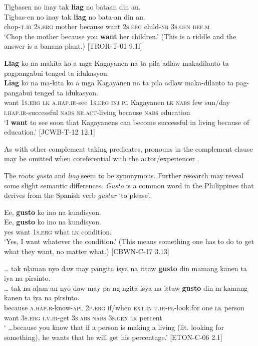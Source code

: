 \ea
Tigbasen  no  inay  tak  \textbf{liag}  no  bataan  din  an. \\\smallskip
\gll Tigbas-en  no  inay  tak  \textbf{liag}  no  bata-an  din  an. \\
chop-\textsc{t.ir}  2\textsc{s.erg}  mother  because  want  2\textsc{s.erg}  child-\textsc{nr}  3\textsc{s.gen}  \textsc{def.m} \\
\glt ‘Chop the mother because you \textbf{want} her children.’ (This is a riddle and the answer is a banana plant.) [TROR-T-01 9.1l]
\z

\ea
\textbf{Liag}  ko  na  makita  ko  a  mga  Kagayanen  na  ta  pila adlaw  makadilanto  ta  pagpangabui  tenged  ta  idukasyon. \\\smallskip
\gll \textbf{Liag}  ko  na  ma-kita  ko  a  mga  Kagayanen  na  ta  pila adlaw  maka-dilanto  ta  pag-pangabui  tenged  ta  idukasyon. \\
want  1\textsc{s.erg}  \textsc{lk}  \textsc{a.hap.ir}-see  1\textsc{s.erg}  \textsc{inj}  \textsc{pl}  Kagayanen  \textsc{lk}  \textsc{nabs}  few
sun/day  \textsc{i.hap.ir}-successful  \textsc{nabs}  \textsc{nr.act}-living  because  \textsc{nabs}  education \\
\glt `I \textbf{want} to see soon that Kagayanens can become successful in living because of education.’ [JCWB-T-12 12.1]
\z

As with other complement taking predicates, pronouns in the complement clause may be omitted when coreferential with the actor/experiencer .

The roots \textit{gusto} and \textit{liag} seem to be synonymous. Further research may reveal some slight semantic differences. \textit{Gusto} is a common word in the Philippines that derives from the Spanish verb \textit{gustar} `to please'. 

\ea
Ee,  \textbf{gusto}  ko  ino  na  kundisyon. \\\smallskip
\gll Ee,  \textbf{gusto}  ko  ino  na  kundisyon. \\
yes  want  1\textsc{s.erg}  what  \textsc{lk}  condition. \\
\glt ‘Yes, I want whatever the condition.’ (This means something one has to do to get what they want, no matter what.) [CBWN-C-17 3.13]
\z

\ea
 … tak  nļaman  nyo  daw  may  pangita isya  na  ittaw  \textbf{gusto}  din  mamang  kanen  ta  iya  na  pirsinto. \\\smallskip
\gll  … tak  na-aļam-an  nyo  daw  may  pa-ng-ngita isya  na  ittaw  \textbf{gusto}  din  m-kamang  kanen  ta  iya  na  pirsinto. \\
{} because  \textsc{a.hap.r}-know-\textsc{apl}  2\textsc{p.erg}  if/when  \textsc{ext.in}  \textsc{t.ir-pl}-look.for
one  \textsc{lk}  person  want  3\textsc{s.erg}  \textsc{i.v.ir}-get  3\textsc{s.abs}  \textsc{nabs}  3\textsc{s.gen}  \textsc{lk}  percent \\
\glt ` …because you know that if a person is making a living (lit. looking for something), he wants that he will get his percentage.’ [ETON-C-06 2.1]
\z

